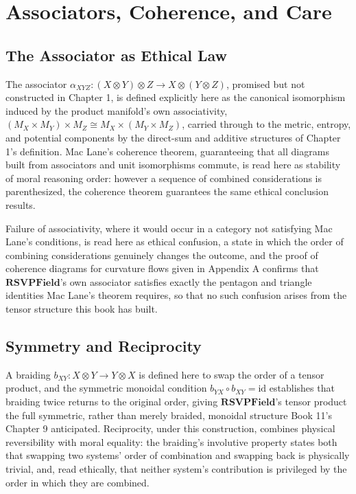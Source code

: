 \part{Associators, Coherence, and Care}

\chapter{The Associator as Ethical Law}

The associator $\alpha_{XYZ}: (X \otimes Y) \otimes Z \to X \otimes (Y \otimes Z)$, promised but not constructed in Chapter 1, is defined explicitly here as the canonical isomorphism induced by the product manifold's own associativity, $(M_X \times M_Y) \times M_Z \cong M_X \times (M_Y \times M_Z)$, carried through to the metric, entropy, and potential components by the direct-sum and additive structures of Chapter 1's definition. Mac Lane's coherence theorem, guaranteeing that all diagrams built from associators and unit isomorphisms commute, is read here as stability of moral reasoning order: however a sequence of combined considerations is parenthesized, the coherence theorem guarantees the same ethical conclusion results.

Failure of associativity, where it would occur in a category not satisfying Mac Lane's conditions, is read here as ethical confusion, a state in which the order of combining considerations genuinely changes the outcome, and the proof of coherence diagrams for curvature flows given in Appendix A confirms that $\mathbf{RSVPField}$'s own associator satisfies exactly the pentagon and triangle identities Mac Lane's theorem requires, so that no such confusion arises from the tensor structure this book has built.

\chapter{Symmetry and Reciprocity}

A braiding $b_{XY}: X \otimes Y \to Y \otimes X$ is defined here to swap the order of a tensor product, and the symmetric monoidal condition $b_{YX} \circ b_{XY} = \mathrm{id}$ establishes that braiding twice returns to the original order, giving $\mathbf{RSVPField}$'s tensor product the full symmetric, rather than merely braided, monoidal structure Book 11's Chapter 9 anticipated. Reciprocity, under this construction, combines physical reversibility with moral equality: the braiding's involutive property states both that swapping two systems' order of combination and swapping back is physically trivial, and, read ethically, that neither system's contribution is privileged by the order in which they are combined.

